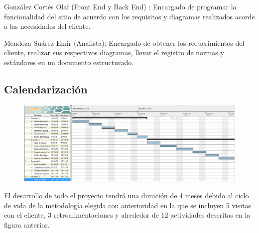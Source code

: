 González Cortés Olaf (Front End y Back End) : Encargado de programar la funcionalidad del sitio de acuerdo con los requisitos y diagramas realizados acorde a las necesidades del cliente.


Mendoza Suárez Emir (Analista): Encargado de obtener los requerimientos del cliente, realizar sus respectivos diagramas, llevar el registro de normas y estándares en un documento estructurado. 


\subsection{Calendarización}


\begin{figure}[htb]
\begin{center}
\includegraphics[width=15cm]{./imagenes/tablas/Diagrama_Gantt.png}
\end{center}

\end{figure}


El desarrollo de todo el proyecto tendrá una duración de 4 meses debido al ciclo de vida de la metodología elegida con anterioridad en la que se incluyen 5 visitas con el cliente, 3 retroalimentaciones y alrededor de 12 actividades descritas en la figura anterior.